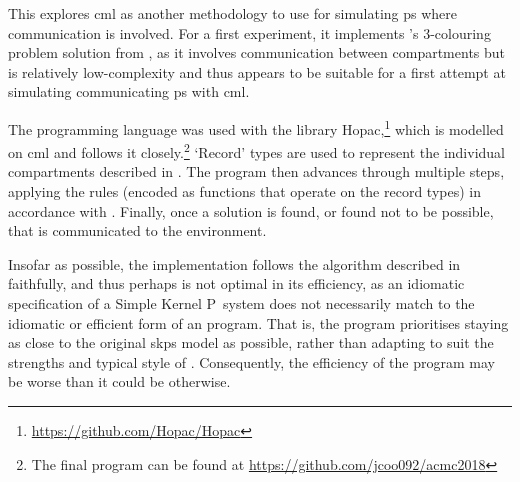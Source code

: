 

This  explores \gls{cml} as another methodology to use for simulating \gls{ps} where communication is involved.  For a first experiment, it implements \citeauthor{Gheorghe2013}'s 3-colouring problem solution from \cite{Gheorghe2013}, as it involves communication between compartments but is relatively low-complexity and thus appears to be suitable for a first attempt at simulating communicating \gls{ps} with \gls{cml}.

The programming language \fsharp{} was used with the library Hopac,\footnote{\url{https://github.com/Hopac/Hopac}} which is modelled on \gls{cml} and follows it closely.\footnote{The final program can be found at \url{https://github.com/jcoo092/acmc2018}}  `Record' types are used to represent the individual compartments described in \cite{Gheorghe2013}.  The program then advances through multiple steps, applying the rules (encoded as functions that operate on the record types) in accordance with \cite{Gheorghe2013}.  Finally, once a solution is found, or found not to be possible, that is communicated to the environment.

Insofar as possible, the implementation follows the algorithm described in \cite{Gheorghe2013} faithfully, and thus perhaps is not optimal in its efficiency, as an idiomatic specification of a Simple Kernel P~system does not necessarily match to the idiomatic or efficient form of an \fsharp{} program.  That is, the program prioritises staying as close to the original \gls{skps} model as possible, rather than adapting to suit the strengths and typical style of \fsharp{}.  Consequently, the efficiency of the program may be worse than it could be otherwise.

